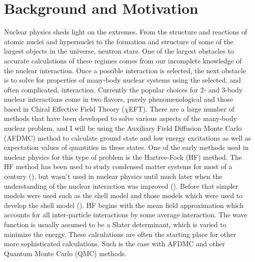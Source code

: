 \chapter{Background and Motivation}
Nuclear physics sheds light on the extremes. From the structure and reactions of atomic nuclei and hypernuclei to the formation and structure of some of the largest objects in the universe, neutron stars. One of the largest obstacles to accurate calculations of these regimes comes from our incomplete knowledge of the nuclear interaction. Once a possible interaction is selected, the next obstacle is to solve for properties of many-body nuclear systems using the selected, and often complicated, interaction. Currently the popular choices for 2- and 3-body nuclear interactions come in two flavors, purely phenomenological and those based in Chiral Effective Field Theory ($\chi$EFT). There are a large number of methods that have been developed to solve various aspects of the many-body nuclear problem, and I will be using the Auxiliary Field Diffusion Monte Carlo (AFDMC) method to calculate ground state and low energy excitations as well as expectation values of quantities in these states. One of the early methods used in nuclear physics for this type of problem is the Hartree-Fock (HF) method. The HF method has been used to study condensed matter systems for most of a century (\cite{hartree1928, fock1930, slater1951}), but wasn't used in nuclear physics until much later when the understanding of the nuclear interaction was improved (\cite{zofka1970, gogny1986}). Before that simpler models were used such as the shell model and those models which were used to develop the shell model (\cite{mayer1950_1,mayer1950_2}). HF begins with the mean field approximation which accounts for all inter-particle interactions by some average interaction. The wave function is usually assumed to be a Slater determinant, which is varied to minimize the energy. These calculations are often the starting place for other more sophisticated calculations. Such is the case with AFDMC and other Quantum Monte Carlo (QMC) methods.

